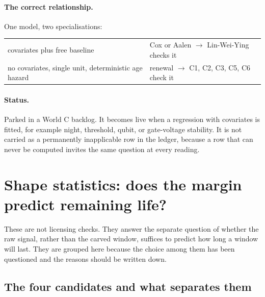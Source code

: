 \documentclass[11pt,a4paper]{article}
\begin{document}
\paragraph{The correct relationship.} One model, two specialisations:
%
\begin{center}
\begin{tabular}{@{}ll@{}}
\toprule
covariates plus free baseline & Cox or Aalen $\rightarrow$ Lin-Wei-Ying checks it\\
no covariates, single unit, deterministic age hazard & renewal $\rightarrow$ C1, C2, C3, C5, C6 check it\\
\bottomrule
\end{tabular}
\end{center}

\paragraph{Status.} Parked in a World C backlog. It becomes live when a regression with
covariates is fitted, for example night, threshold, qubit, or gate-voltage stability. It
is not carried as a permanently inapplicable row in the ledger, because a row that can
never be computed invites the same question at every reading.

\section{Shape statistics: does the margin predict remaining life?}

These are not licensing checks. They answer the separate question of whether the raw
signal, rather than the carved window, suffices to predict how long a window will last.
They are grouped here because the choice among them has been questioned and the reasons
should be written down.

\subsection{The four candidates and what separates them}
\end{document}
